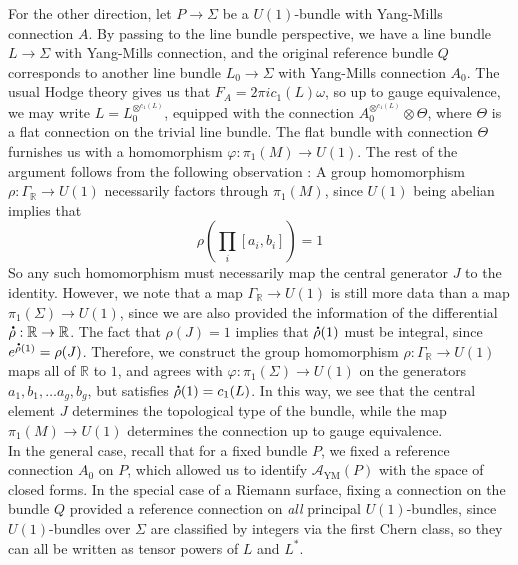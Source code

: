 \documentclass[psamsfonts, 12pt]{amsart}
\theoremstyle{definition}
\theoremstyle{remark}
\newcommand{\R}{\mathbb{R}}
\newcommand*{\dt}[1]{%
   \accentset{\mbox{\large\bfseries .}}{#1}}
\begin{document}
For the other direction, let $P \to \Sigma$ be a $U(1)$-bundle with Yang-Mills
connection $A$. By passing to the line bundle perspective, we have a line
bundle $L \to \Sigma$ with Yang-Mills connection, and the original reference bundle
$Q$ corresponds to another line bundle $L_0 \to \Sigma$ with Yang-Mills connection
$A_0$. The usual Hodge theory gives us that $F_A = 2\pi i c_1(L) \omega$, so
up to gauge equivalence, we may write $L = L_0^{\otimes^{c_1(L)}}$, equipped with
the connection $A_0^{\otimes^{c_1(L)}} \otimes \Theta$, where $\Theta$ is a flat
connection on the trivial line bundle. The flat bundle with connection $\Theta$
furnishes us with a homomorphism $\varphi : \pi_1(M) \to U(1)$. The rest of the
argument follows from the following observation : A group homomorphism
$\rho : \Gamma_\R \to U(1)$ necessarily factors through $\pi_1(M)$, since
$U(1)$ being abelian implies that
\[
\rho\left(\prod_i [a_i,b_i]\right) = 1
\]
So any such homomorphism must necessarily map the central generator $J$ to the
identity. However, we note that a map $\Gamma_\R \to U(1)$ is still more
data than a map $\pi_1(\Sigma) \to U(1)$, since we are also provided the information
of the differential $\dt{\rho} : \R \to \R$. The fact that $\rho(J) = 1$ implies
that $\dt{\rho}(1)$ must be integral, since $e^{\dt{\rho}(1)} = \rho(J)$. Therefore,
we construct the group homomorphism $\rho : \Gamma_\R \to U(1)$ maps all
of $\R$ to $1$, and agrees with $\varphi : \pi_1(\Sigma) \to U(1)$ on the generators
$a_1,b_1,\ldots a_g,b_g$, but satisfies $\dt{\rho}(1) = c_1(L)$. In this way, we
see that the central element $J$ determines the topological type of the bundle,
while the map $\pi_1(M) \to U(1)$ determines the connection up to gauge equivalence. \\

In the general case, recall that for a fixed bundle $P$, we fixed a reference
connection $A_0$ on $P$, which allowed us to identify $\mathscr{A}_{\text{YM}}(P)$ with
the space of closed forms. In the special case of a Riemann surface, fixing a connection
on the bundle $Q$ provided a reference connection on \emph{all} principal
$U(1)$-bundles, since $U(1)$-bundles over $\Sigma$ are classified by integers via the
first Chern class, so they can all be written as tensor powers of $L$ and $L^*$.
%
\end{document}
